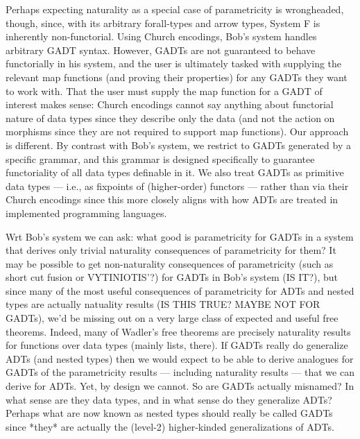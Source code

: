 \documentclass[acmsmall,screen,review,anonymous]{acmart}
\theoremstyle{definition}
\begin{document}
Perhaps expecting naturality as a special case of parametricity is
wrongheaded, though, since, with its arbitrary forall-types and arrow
types, System F is inherently non-functorial. Using Church encodings,
Bob's system handles arbitrary GADT syntax. However, GADTs are not
guaranteed to behave functorially in his system, and the user is
ultimately tasked with supplying the relevant map functions (and
proving their properties) for any GADTs they want to work with. That
the user must supply the map function for a GADT of interest makes
sense: Church encodings cannot say anything about functorial nature of
data types since they describe only the data (and not the action on
morphisms since they are not required to support map functions).  Our
approach is different. By contrast with Bob's system, we restrict to
GADTs generated by a specific grammar, and this grammar is designed
specifically to guarantee functoriality of all data types definable in
it. We also treat GADTs as primitive data types --- i.e., as fixpoints
of (higher-order) functors --- rather than via their Church encodings
since this more closely aligns with how ADTs are treated in
implemented programming languages.

Wrt Bob's system we can ask: what good is parametricity for GADTs in a
system that derives only trivial naturality consequences of
parametricity for them? It may be possible to get non-naturality
consequences of parametricity (such as short cut fusion or
VYTINIOTIS'?) for GADTs in Bob's system (IS IT?), but since many of
the most useful consequences of parametricity for ADTs and nested
types are actually natuality results (IS THIS TRUE? MAYBE NOT FOR
GADTs), we'd be missing out on a very large class of expected and
useful free theorems. Indeed, many of Wadler's free theorems are
precisely naturality results for functions over data types (mainly
lists, there). If GADTs really do generalize ADTs (and nested types)
then we would expect to be able to derive analogues for GADTs of the
parametricity results --- including naturality results --- that we can
derive for ADTs. Yet, by design we cannot. So are GADTs actually
misnamed? In what sense are they data types, and in what sense do they
generalize ADTs? Perhaps what are now known as nested types should
really be called GADTs since *they* are actually the (level-2)
higher-kinded generalizations of ADTs.
\end{document}
